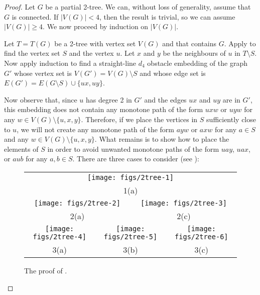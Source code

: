 \documentclass{patmorin}
\begin{document}
\begin{proof}
  Let $G$ be a partial 2-tree. We can, without loss of generality, assume
  that $G$ is connected.  If $|V(G)|< 4$, then the result is trivial, so
  we can assume $|V(G)|\ge 4$.  We now proceed by induction on $|V(G)|$.

  Let $T=T(G)$ be a 2-tree with vertex set $V(G)$ and that contains $G$.
  Apply  to find the vertex set $S$ and the vertex $u$.
  Let $x$ and $y$ be the neighbours of $u$ in $T\setminus S$. Now apply
  induction to find a straight-line $d_4$ obstacle embedding of the
  graph $G'$ whose vertex set is $V(G')=V(G)\setminus S$ and whose edge
  set is $E(G')=E(G\setminus S)\cup\{ux,uy\}$.

  Now observe that, since $u$ has degree 2 in $G'$ and the edges $ux$
  and $uy$ are in $G'$, this embedding does not contain any monotone path
  of the form $uxw$ or $uyw$ for any $w\in V(G)\setminus\{u,x,y\}$.
  Therefore, if we place the vertices in $S$ sufficiently close to $u$,
  we will not create any monotone path of the form $ayw$ or $axw$ for
  any $a\in S$ and any $w\in V(G)\setminus \{u,x,y\}$.  What remains
  is to show how to place the elements of $S$ in order to avoid unwanted
  monotone paths of the form $uay$, $uax$, or $aub$ for any $a,b\in S$.
  There are three cases to consider (see ):

  \begin{figure}
    \begin{tabular}{cccccc}
       \multicolumn{6}{c}{\texttt{[image: figs/2tree-1]}} \\
       \multicolumn{6}{c}{1(a)} \\
       \multicolumn{3}{c}{\texttt{[image: figs/2tree-2]}} & 
       \multicolumn{3}{c}{\texttt{[image: figs/2tree-3]}} \\
       \multicolumn{3}{c}{2(a)} &
       \multicolumn{3}{c}{2(c)} \\
       \multicolumn{2}{c}{\texttt{[image: figs/2tree-4]}} &
       \multicolumn{2}{c}{\texttt{[image: figs/2tree-5]}} &
       \multicolumn{2}{c}{\texttt{[image: figs/2tree-6]}} \\
       \multicolumn{2}{c}{3(a)} &
       \multicolumn{2}{c}{3(b)} &
       \multicolumn{2}{c}{3(c)} 
    \end{tabular}
  \caption{The proof of .}
  \end{figure}
  
  \begin{enumerate}


\end{enumerate}
\end{proof}
\end{document}
